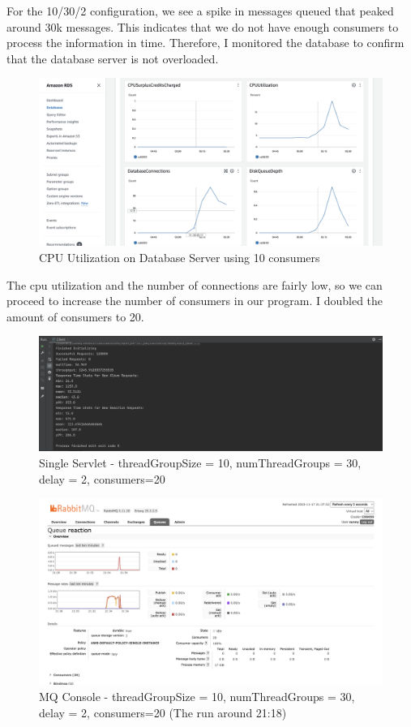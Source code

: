\documentclass[a4paper,12pt]{article} %
\begin{document}
\begin{enumerate}
For the 10/30/2 configuration, we see a spike in messages queued that peaked around 30k messages. This indicates that we do not have enough consumers to process the information in time.
Therefore, I monitored the database to confirm that the database server is not overloaded.
\begin{figure}[H]
    \centering
    \includegraphics[width=\textwidth]{images/rds_util_connections.png}
    \caption{CPU Utilization on Database Server using 10 consumers}
\end{figure}
The cpu utilization and the number of connections are fairly low, so we can proceed to increase the number of consumers in our program.
I doubled the amount of consumers to 20.
\begin{figure}[H]
    \centering
    \includegraphics[width=\textwidth]{images/stats_20consumer.png}
    \caption{Single Servlet - threadGroupSize = 10, numThreadGroups = 30, delay = 2, consumers=20}
\end{figure}
\begin{figure}[H]
    \centering
    \includegraphics[width=\textwidth]{images/rabbit_mq_20consumer.png}
    \caption{MQ Console - threadGroupSize = 10, numThreadGroups = 30, delay = 2, consumers=20 (The run around 21:18)}
\end{figure}


\end{enumerate}
\end{document}
